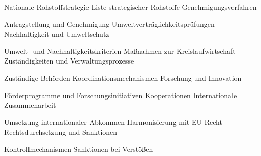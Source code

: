 Nationale Rohstoffstrategie
Liste strategischer Rohstoffe
Genehmigungsverfahren

Antragstellung und Genehmigung
Umweltverträglichkeitsprüfungen
Nachhaltigkeit und Umweltschutz

Umwelt- und Nachhaltigkeitskriterien
Maßnahmen zur Kreislaufwirtschaft
Zuständigkeiten und Verwaltungsprozesse

Zuständige Behörden
Koordinationsmechanismen
Forschung und Innovation

Förderprogramme und Forschungsinitiativen
Kooperationen
Internationale Zusammenarbeit

Umsetzung internationaler Abkommen
Harmonisierung mit EU-Recht
Rechtsdurchsetzung und Sanktionen

Kontrollmechanismen
Sanktionen bei Verstößen

